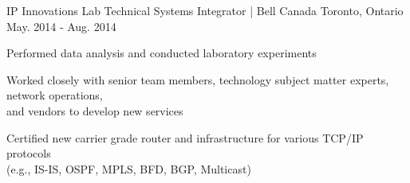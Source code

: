 \begin{cventries}
{\begin{cvitems}
      \end{cvitems}
    }
  \cventry
    {IP Innovations Lab}
    {Technical Systems Integrator | Bell Canada}
    {Toronto, Ontario}
    {May. 2014 - Aug. 2014}
    {
      \begin{cvitems}
        \item {Performed data analysis and conducted laboratory experiments}
        \item {Worked closely with senior team members, technology subject matter experts, network operations, \\ and vendors to develop new services}
        \item {Certified new carrier grade router and infrastructure for various TCP/IP protocols \\ (e.g., IS-IS, OSPF, MPLS, BFD, BGP, Multicast)}
      \end{cvitems}
    }
\end{cventries}
